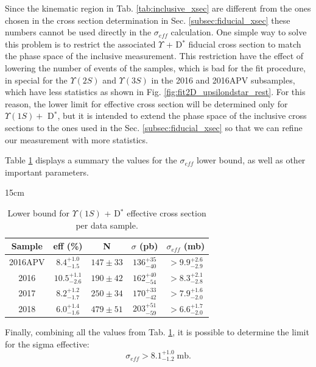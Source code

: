Since the kinematic region in Tab. \ref{tab:inclusive_xsec} are different from the ones chosen in the cross section determination in Sec. \ref{subsec:fiducial_xsec} these numbers cannot be used directly in the $\sigma_{eff}$ calculation. One simple way to solve this problem is to restrict the associated $\Upsilon$ + D$^*$ fiducial cross section to match the phase space of the inclusive measurement. This restriction have the effect of lowering the number of events of the samples, which is bad for the fit procedure, in special for the $\Upsilon(2S)$ and $\Upsilon(3S)$ in the 2016 and 2016APV subsamples, which have less statistics as shown in Fig. \ref{fig:fit2D_upsilondstar_rest}. For this reason, the lower limit for effective cross section will be determined only for $\Upsilon(1S) +$ D$^*$, but it is intended to extend the phase space of the inclusive cross sections to the ones used in the Sec. \ref{subsec:fiducial_xsec} so that we can refine our measurement with more statistics. 

Table \ref{tab:xsec_eff} displays a summary the values for the $\sigma_{eff}$ lower bound, as well as other important parameters.

\begin{table}[!htbp]{15cm}
  \caption{Lower bound for $\Upsilon(1S)$ + D$^{*}$ effective cross section per data sample.}
  \begin{tabular}{ c | c | c | c | c }
    \hline
    Sample & eff (\%) & N & $\sigma$ (pb) & $\sigma_{eff}$ (mb) \\ \hline
    2016APV & $8.4^{+1.0}_{-1.5}$ & $147 \pm 33$ & $136^{+35}_{-40}$ & $>9.9^{+2.6}_{-2.9}$ \\ \hline 
    2016    & $10.5^{+1.1}_{-2.6}$ & $190 \pm 42$ & $162^{+40}_{-54}$ & $>8.3^{+2.1}_{-2.8}$ \\ \hline 
    2017    & $8.2^{+1.2}_{-1.7}$ & $250 \pm 34$ & $170^{+33}_{-42}$ & $>7.9^{+1.6}_{-2.0}$ \\ \hline 
    2018    & $6.0^{+1.4}_{-1.6}$ & $479 \pm 51$ & $203^{+51}_{-59}$ & $>6.6^{+1.7}_{-2.0}$ \\ \hline
  \end{tabular}
  \label{tab:xsec_eff}
\end{table}

Finally, combining all the values from Tab. \ref{tab:xsec_eff}, it is possible to determine the limit for the sigma effective:
\begin{equation}
  \sigma_{eff} > 8.1^{+1.0}_{-1.2} \; \text{mb}.
\end{equation}

